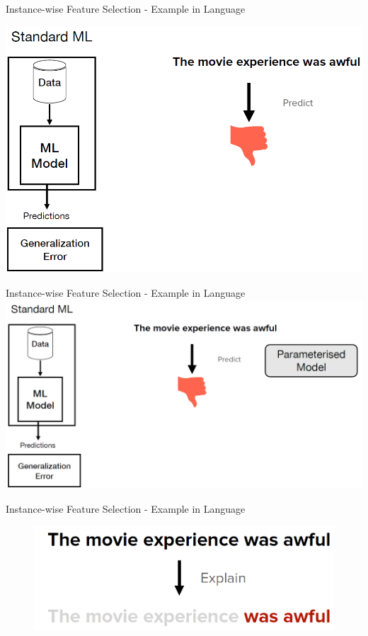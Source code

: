 \documentclass[11pt,compress,t,notes=noshow, aspectratio=169, xcolor=table]{beamer}
\begin{document}
\begin{frame}{Instance-wise Feature Selection - Example in Language}

\centerline{\includegraphics[width=0.6\linewidth,left]{bild6}}

\end{frame}

\begin{frame}{Instance-wise Feature Selection - Example in Language}
    \includegraphics[scale=.36, left]{bild7}
\end{frame}

\begin{frame}{Instance-wise Feature Selection - Example in Language}


    \begin{figure}
    \includegraphics[width=0.6\linewidth]{bild8}
    \end{figure}
\end{frame}
\end{document}
